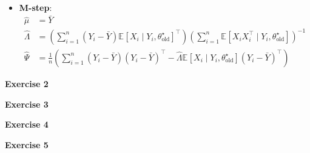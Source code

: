 \documentclass[10pt,notitlepage]{article}
\newcommand{\MBlue}[1]{{\color{MBlue}#1}}
\newcommand{\mean}[2][]{\mathbb{E}_{#1}\left[#2\right]}
\begin{document}
\begin{exercise}[Solution]
\begin{itemize}
\begin{align*}
                    \end{align*}
            \item \textbf{M-step}:
                    \begin{align*}
                        \hat{\mu} &= \bar{Y}\\
                        \hat{\Lambda}&=\left(\sum_{i=1}^{n}\left(Y_i-\bar{Y}\right)\mean{X_i\mid Y_i, \theta^\star_{\text{old}}}^\top\right)\left(\sum_{i=1}^{n}\mean{X_i X_i^\top\mid Y_i, \theta^\star_{\text{old}}}\right)^{-1}\\
                        \hat{\Psi} &= \frac{1}{n}\left(\sum_{i=1}^{n}\left(Y_i-\bar{Y}\right)\left(Y_i-\bar{Y}\right)^\top - \hat{\Lambda}\mean{X_i\mid Y_i, \theta^\star_{\text{old}}}\left(Y_i-\bar{Y}\right)^\top\right)
                    \end{align*}
        \end{itemize}
    \end{exercise}

    \newpage
    \textbf{\large \MBlue{Exercise 2}}
    \vskip10pt
    \noindent
	\begin{exercise}[Solution]
    \end{exercise}

    \newpage
    \textbf{\large \MBlue{Exercise 3}}
    \vskip10pt
    \noindent
	\begin{exercise}[Solution]
    \end{exercise}

    \newpage
    \textbf{\large \MBlue{Exercise 4}}
    \vskip10pt
    \noindent
	\begin{exercise}[Solution]
    \end{exercise}

    \newpage
    \textbf{\large \MBlue{Exercise 5}}
    \vskip10pt
    \noindent
	\begin{exercise}[Solution]
    \end{exercise}
\end{document}
